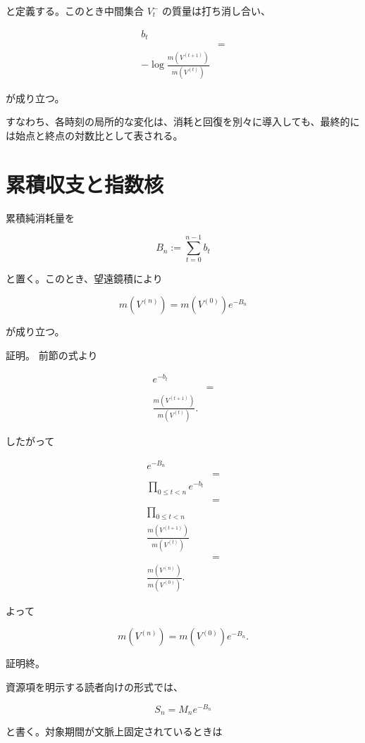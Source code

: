 \documentclass[12pt,a4paper]{article}
\begin{document}
と定義する。このとき中間集合 \(V_{t}^-\) の質量は打ち消し合い、

\[
\begin{aligned}
b_{t} \\
&= \\
-\log \frac{m(V^{(t+1)})}{m(V^{(t)})}
\end{aligned}
\]

が成り立つ。

すなわち、各時刻の局所的な変化は、消耗と回復を別々に導入しても、最終的には始点と終点の対数比として表される。

\section{累積収支と指数核}\label{ux7d2fux7a4dux53ceux652fux3068ux6307ux6570ux6838}

累積純消耗量を

\[
B_{n} := \sum_{t=0}^{n-1} b_{t}
\]

と置く。このとき、望遠鏡積により

\[
m(V^{(n)}) = m(V^{(0)}) e^{-B_{n}}
\]

が成り立つ。

証明。 前節の式より

\[
\begin{aligned}
e^{-b_{t}} \\
&= \\
\frac{m(V^{(t+1)})}{m(V^{(t)})}.
\end{aligned}
\]

したがって

\[
\begin{aligned}
e^{-B_{n}} \\
&= \\
\prod_{0\le t<n} e^{-b_{t}} \\
&= \\
\prod_{0\le t<n} \\
\frac{m(V^{(t+1)})}{m(V^{(t)})} \\
&= \\
\frac{m(V^{(n)})}{m(V^{(0)})}.
\end{aligned}
\]

よって

\[
m(V^{(n)}) = m(V^{(0)})e^{-B_{n}}.
\]

証明終。

資源項を明示する読者向けの形式では、

\[
S_{n} = M_{n} e^{-B_{n}}
\]

と書く。対象期間が文脈上固定されているときは
\end{document}
